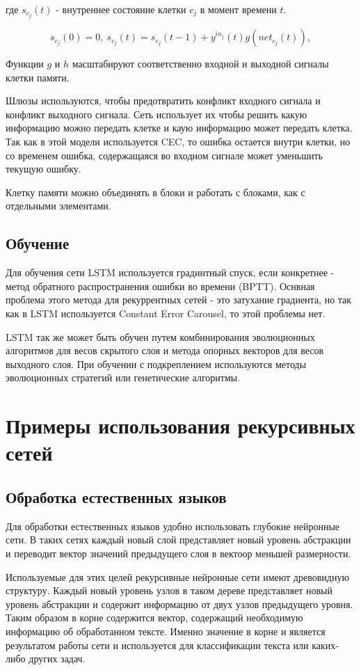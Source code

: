 \documentclass[14pt]{article}
\begin{document}
где $s_{c_j}(t)$ - внутреннее состояние клетки $c_j$ в момент времени $t$.

\begin{equation}
s_{c_j}(0) = 0,~s_{c_j}(t) = s_{c_j}(t - 1) + y^{in_j}(t)g(net_{c_j}(t)),\nonumber
\end{equation}

Функции $g$ и $h$ масштабируют соответственно входной и выходной сигналы клетки памяти.


Шлюзы используются, чтобы предотвратить конфликт входного сигнала  и конфликт выходного сигнала. Сеть использует их чтобы решить какую информацию можно передать клетке и каую информацию может передать клетка. Так как в этой модели используется CEC, то ошибка остается внутри клетки, но со временем ошибка, содержащаяся во входном сигнале может уменьшить текущую ошибку.


Клетку памяти можно объединять в блоки и работать с блоками, как с отдельными элементами.

\subsection{Обучение}
Для обучения сети LSTM используется градинтный спуск, если конкретнее - метод обратного распространения ошибки во времени (BPTT). Оснвная проблема этого метода для рекуррентных сетей - это затухание градиента, но так как в LSTM используется Constant Error Carousel, то этой проблемы нет.


LSTM так же может быть обучен путем комбинирования эволюционных алгоритмов для весов скрытого слоя и метода опорных векторов для весов выходного слоя. При обучении с подкреплением используются методы эволюционных стратегий или генетические алгоритмы.


\section{Примеры использования рекурсивных сетей}

\subsection{Обработка естественных языков}
Для обработки естественных языков удобно использовать глубокие нейронные сети. В таких сетях каждый новый слой представляет новый уровень абстракции и переводит вектор значений предыдущего слоя в вектоор меньшей размерности.


Используемые для этих целей рекурсивные нейронные сети имеют древовидную структуру. Каждый новый уровень узлов в таком дереве представляет новый уровень абстракции и содержит информацию от двух узлов предыдущего уровня. Таким образом в корне содержится вектор, содержащий необходимую информацию об обработанном тексте.
Именно значение в корне и является результатом работы сети и используется для классификации текста или каких-либо других задач.
\end{document}
